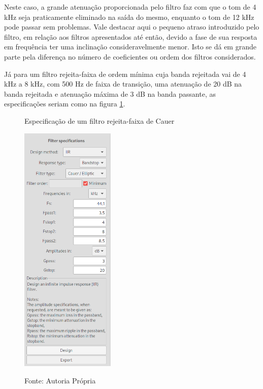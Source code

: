 \documentclass[12pt,a4paper]{report}
\begin{document}
  Neste caso, a grande atenuação proporcionada pelo filtro faz com que o tom de 4 kHz seja praticamente eliminado
  na saída do mesmo, enquanto o tom de 12 kHz pode passar sem problemas. Vale destacar aqui o pequeno atraso
  introduzido pelo filtro, em relação aos filtros apresentados até então, devido a fase de sua resposta em
  frequência ter uma inclinação consideravelmente menor. Isto se dá em grande parte pela diferença no número
  de coeficientes ou ordem dos filtros considerados.

  Já para um filtro rejeita-faixa de ordem mínima cuja banda rejeitada vai de 4 kHz a 8 kHz, com 500 Hz de faixa
  de transição, uma atenuação de 20 dB na banda rejeitada e atenuação máxima de 3 dB na banda passante, as
  especificações seriam como na figura \ref{fig:cauer_specifications}.
  \begin{figure}[H]
    \caption{Especificação de um filtro rejeita-faixa de Cauer}
    \centering
    \includegraphics[width=0.4\textwidth]{images/cauer_specifications}
    \label{fig:cauer_specifications}
    \caption*{Fonte: Autoria Própria}
  \end{figure}
\end{document}
